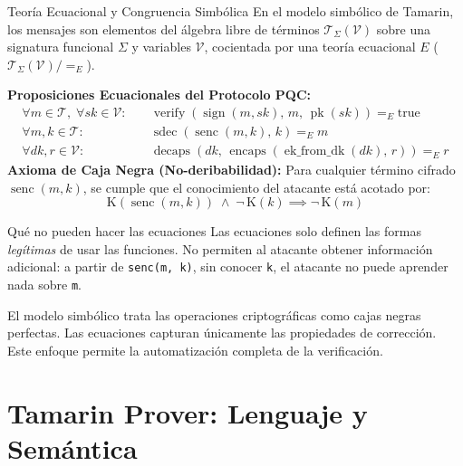 \documentclass[12pt, a4paper, twoside, openright]{book}
\begin{document}
\begin{cajaLogica}{Teor\'ia Ecuacional y Congruencia Simb\'olica}
  En el modelo simb\'olico de Tamarin, los mensajes son elementos del \'algebra libre de t\'erminos $\mathcal{T}_\Sigma(\mathcal{V})$ sobre una signatura funcional $\Sigma$ y variables $\mathcal{V}$, cocientada por una teor\'ia ecuacional $E$ ($\mathcal{T}_\Sigma(\mathcal{V}) / =_E$).
  
  \textbf{Proposiciones Ecuacionales del Protocolo PQC:}
  \begin{align*}
    \forall m \in \mathcal{T},\; \forall sk \in \mathcal{V}: & \quad
      \operatorname{verify}(\operatorname{sign}(m, sk),\, m,\, \operatorname{pk}(sk)) =_E \mathrm{true} \\
    \forall m, k \in \mathcal{T}: & \quad
      \operatorname{sdec}(\operatorname{senc}(m, k),\, k) =_E m \\
    \forall dk, r \in \mathcal{V}: & \quad
      \operatorname{decaps}(dk,\, \operatorname{encaps}(\operatorname{ek\_from\_dk}(dk),\, r)) =_E r
  \end{align*}
  \textbf{Axioma de Caja Negra (No-deribabilidad):} Para cualquier t\'ermino cifrado $\operatorname{senc}(m, k)$, se cumple que el conocimiento del atacante est\'a acotado por:
  \[
    \mathrm{K}(\operatorname{senc}(m, k)) \;\land\; \neg\,\mathrm{K}(k) \implies \neg\,\mathrm{K}(m)
  \]
\end{cajaLogica}

\begin{cajaAviso}{Qu\'e no pueden hacer las ecuaciones}
  Las ecuaciones solo definen las formas \emph{leg\'itimas} de usar
  las funciones. No permiten al atacante obtener informaci\'on
  adicional: a partir de \texttt{senc(m, k)}, sin conocer \texttt{k},
  el atacante no puede aprender nada sobre \texttt{m}.
\end{cajaAviso}

\begin{cajaResumen}
  El modelo simb\'olico trata las operaciones criptogr\'aficas como
  cajas negras perfectas. Las ecuaciones capturan \'unicamente las
  propiedades de correcci\'on. Este enfoque permite la automatizaci\'on
  completa de la verificaci\'on.
\end{cajaResumen}

\part{Tamarin Prover: Lenguaje y Sem\'antica}
\end{document}
